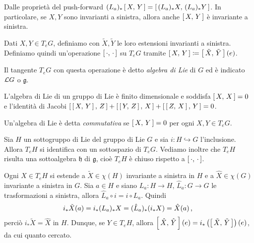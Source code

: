 Dalle proprietà del push-forward $(L_a)_* \left[\,X,\,Y\,\right] = \left[\,(L_a)_*X,\,(L_a)_*Y\,\right]$. In particolare, se $X,Y$ sono invarianti a sinistra, allora anche $\left[\,X,\,Y\,\right]$ è invariante a sinistra.

Dati $X,Y \in T_eG$, definiamo con $\tilde X,\tilde Y$ le loro estensioni invarianti a sinistra.
Definiamo quindi un'operazione $\left[\,\cdot,\,\cdot\,\right]$ su $T_eG$ tramite $\left[\,X,\,Y\,\right] \coloneqq \left[\,\tilde X,\,\tilde Y\,\right](e)$. %

\begin{definition} 
	Il tangente $T_eG$ con questa operazione è detto \emph{algebra di Lie} di $G$ ed è indicato $\mathcal L G$ o $\mathfrak g$.
\end{definition}

L'algebra di Lie di un gruppo di Lie è finito dimensionale e soddisfa $\left[\,X,\,X\,\right] = 0$ e l'identità di Jacobi $\left[\,\left[\,X,\,Y\,\right],\,Z\,\right] + \left[\,\left[\,Y,\,Z\,\right],\,X\,\right] + \left[\,\left[\,Z,\,X\,\right],\,Y\,\right] = 0$.


\begin{definition} 
	Un'algebra di Lie è detta \emph{commutativa} se $\left[\,X,\,Y\,\right] = 0$ per ogni $X,Y \in T_eG$.
\end{definition}


Sia $H$ un sottogruppo di Lie del gruppo di Lie $G$ e sia $i: H \hookrightarrow G$ l'inclusione. Allora $T_eH$ si identifica con un sottospazio di $T_eG$. Vediamo inoltre che $T_eH$ risulta una sottoalgebra $\mathfrak h$ di $\mathfrak g$, cioè $T_eH$ è chiuso rispetto a $\left[\,\cdot,\,\cdot\,\right]$.


Ogni $X \in T_eH$ si estende a $\tilde X \in \chi(H)$ invariante a sinistra in $H$ e a $\hat X \in \chi(G)$ invariante a sinistra in $G$.
Sia $a\in H$ e siano $L_a:H\to H$, $\hat L_a:G \to G$ le trasformazioni a sinistra, allora $\hat L_a \circ i = i \circ L_a$. Quindi
\begin{equation*}
i_* \tilde X(a) = i_* (L_a)_* X = (\hat L_a)_* (i_* X) = \hat X(a)\, \text{, }
\end{equation*}
perciò $i_* \tilde X = \hat X$ in $H$.
Dunque, se $Y \in T_eH$, allora $\left[\,\hat X,\,\hat Y\,\right](e) = i_*\left( \left[\,\tilde X,\,\tilde Y\,\right]\right)(e)$, da cui quanto cercato.

